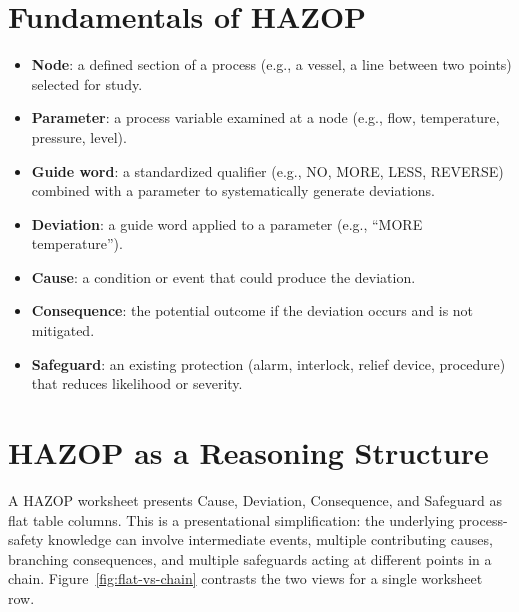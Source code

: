 \section{Fundamentals of HAZOP}
\begin{itemize}
  \item \textbf{Node}: a defined section of a process (e.g., a vessel, a line between two points) selected for study.
  \item \textbf{Parameter}: a process variable examined at a node (e.g., flow, temperature, pressure, level).
  \item \textbf{Guide word}: a standardized qualifier (e.g., NO, MORE, LESS, REVERSE) combined with a parameter to systematically generate deviations.
  \item \textbf{Deviation}: a guide word applied to a parameter (e.g., ``MORE temperature'').
  \item \textbf{Cause}: a condition or event that could produce the deviation.
  \item \textbf{Consequence}: the potential outcome if the deviation occurs and is not mitigated.
  \item \textbf{Safeguard}: an existing protection (alarm, interlock, relief device, procedure) that reduces likelihood or severity.
\end{itemize}

\section{HAZOP as a Reasoning Structure}
A HAZOP worksheet presents Cause, Deviation, Consequence, and Safeguard as flat table columns. This is a presentational simplification: the underlying process-safety knowledge can involve intermediate events, multiple contributing causes, branching consequences, and multiple safeguards acting at different points in a chain. Figure~\ref{fig:flat-vs-chain} contrasts the two views for a single worksheet row.

